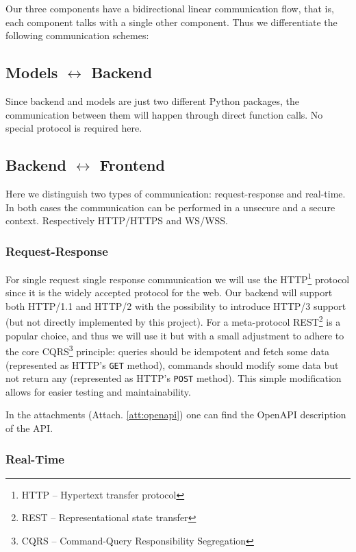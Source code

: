 \documentclass{article}
\begin{document}
Our three components have a bidirectional linear communication flow, that is, each component talks with a single other component. Thus we differentiate the following communication schemes:

\subsection{Models \texorpdfstring{$\leftrightarrow$}{<->} Backend}

Since backend and models are just two different Python packages, the communication between them will happen through direct function calls. No special protocol is required here.

\subsection{Backend \texorpdfstring{$\leftrightarrow$}{<->} Frontend}

Here we distinguish two types of communication: request-response and real-time. In both cases the communication can be performed in a unsecure and a secure context. Respectively HTTP/HTTPS and WS/WSS.

\subsubsection{Request-Response}

For single request single response communication we will use the HTTP\footnote{HTTP -- Hypertext transfer protocol} protocol since it is the widely accepted protocol for the web. Our backend will support both HTTP/1.1 and HTTP/2 with the possibility to introduce HTTP/3 support (but not directly implemented by this project). For a meta-protocol REST\footnote{REST -- Representational state transfer} is a popular choice, and thus we will use it but with a small adjustment to adhere to the core CQRS\cite{CQRS}\footnote{CQRS -- Command-Query Responsibility Segregation} principle: queries should be idempotent and fetch some data (represented as HTTP's \texttt{GET} method), commands should modify some data but not return any (represented as HTTP's \texttt{POST} method). This simple modification allows for easier testing and maintainability.

In the attachments (Attach. \ref{att:openapi}) one can find the OpenAPI description of the API.

\subsubsection{Real-Time}
\end{document}
